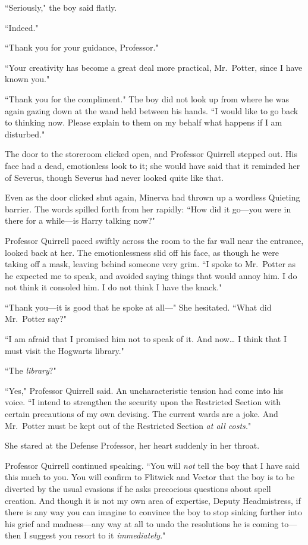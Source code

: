 ``Seriously," the boy said flatly.

``Indeed."

``Thank you for your guidance, Professor."

``Your creativity has become a great deal more practical, Mr.~Potter, since I have known you."

``Thank you for the compliment." The boy did not look up from where he was again gazing down at the wand held between his hands. ``I would like to go back to thinking now. Please explain to them on my behalf what happens if I am disturbed."

\later

The door to the storeroom clicked open, and Professor Quirrell stepped out. His face had a dead, emotionless look to it; she would have said that it reminded her of Severus, though Severus had never looked quite like that.

Even as the door clicked shut again, Minerva had thrown up a wordless Quieting barrier. The words spilled forth from her rapidly: ``How did it go---you were in there for a while---is Harry talking now?"

Professor Quirrell paced swiftly across the room to the far wall near the entrance, looked back at her. The emotionlessness slid off his face, as though he were taking off a mask, leaving behind someone very grim. ``I spoke to Mr.~Potter as he expected me to speak, and avoided saying things that would annoy him. I do not think it consoled him. I do not think I have the knack."

``Thank you---it is good that he spoke at all---" She hesitated. ``What did Mr.~Potter say?"

``I am afraid that I promised him not to speak of it. And now{\ldots} I think that I must visit the Hogwarts library."

``The \emph{library}?"

``Yes," Professor Quirrell said. An uncharacteristic tension had come into his voice. ``I intend to strengthen the security upon the Restricted Section with certain precautions of my own devising. The current wards are a joke. And Mr.~Potter must be kept out of the Restricted Section \emph{at all costs.}"

She stared at the Defense Professor, her heart suddenly in her throat.

Professor Quirrell continued speaking. ``You will \emph{not} tell the boy that I have said this much to you. You will confirm to Flitwick and Vector that the boy is to be diverted by the usual evasions if he asks precocious questions about spell creation. And though it is not my own area of expertise, Deputy Headmistress, if there is any way you can imagine to convince the boy to stop sinking further into his grief and madness---any way at all to undo the resolutions he is coming to---then I suggest you resort to it \emph{immediately}."
